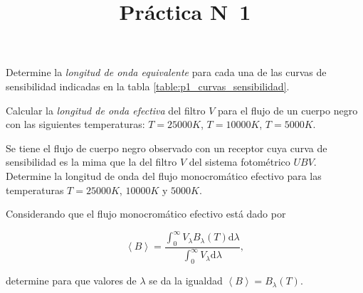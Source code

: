 \documentclass[12pt,a4paper]{practice}
\begin{document}
    \title{Práctica N\textdegree\ 1}
    \maketitle

    \begin{problem}\label{prob:1}
        Determine la \emph{longitud de onda equivalente} para cada una de las curvas de sensibilidad indicadas en la tabla \ref{table:p1_curvas_sensibilidad}.
    \end{problem}

    \begin{problem}\label{prob:2}
        Calcular la \emph{longitud de onda efectiva} del filtro $V$ para el flujo de un cuerpo negro con las siguientes temperaturas: $T = 25000 K$, $T = 10000 K$, $T = 5000 K$.
    \end{problem}

    \begin{problem}\label{prob:3}
        Se tiene el flujo de cuerpo negro observado con un receptor cuya curva de sensibilidad es la mima que la del filtro $V$ del sistema fotométrico $UBV$. Determine la longitud de onda del flujo monocromático efectivo para las temperaturas $T = 25000 K$, $10000 K$ y $5000 K$.

        \begin{recommendation}
            Considerando que el flujo monocromático efectivo está dado por

                $$\left\langle B\right\rangle = \frac{\displaystyle{\int_{0}^{\infty} V_{\lambda} B_{\lambda} \left(T\right) \mathrm{d}\lambda}}{\displaystyle{\int_{0}^{\infty} V_{\lambda} \mathrm{d}\lambda}},$$

            determine para que valores de $\lambda$ se da la igualdad $\left\langle B\right\rangle = B_{\lambda} \left(T\right)$.
        \end{recommendation}
    \end{problem}
\end{document}
